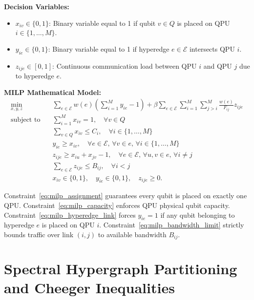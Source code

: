 \textbf{Decision Variables:}
\begin{itemize}
    \item $x_{iv} \in \{0, 1\}$: Binary variable equal to 1 if qubit $v \in Q$ is placed on QPU $i \in \{1, \dots, M\}$.
    \item $y_{ie} \in \{0, 1\}$: Binary variable equal to 1 if hyperedge $e \in \mathcal{E}$ intersects QPU $i$.
    \item $z_{ije} \in [0, 1]$: Continuous communication load between QPU $i$ and QPU $j$ due to hyperedge $e$.
\end{itemize}

\textbf{MILP Mathematical Model:}
\begin{align}
    \min_{x, y, z} \quad & \sum_{e \in \mathcal{E}} w(e) \left( \sum_{i=1}^M y_{ie} - 1 \right) + \beta \sum_{e \in \mathcal{E}} \sum_{i=1}^M \sum_{j > i}^M \frac{w(e)}{F_{ij}} z_{ije} \label{eq:milp_objective} \\
    \text{subject to} \quad & \sum_{i=1}^M x_{iv} = 1, \quad \forall v \in Q \label{eq:milp_assignment} \\
    & \sum_{v \in Q} x_{iv} \le C_i, \quad \forall i \in \{1, \dots, M\} \label{eq:milp_capacity} \\
    & y_{ie} \ge x_{iv}, \quad \forall e \in \mathcal{E}, \, \forall v \in e, \, \forall i \in \{1, \dots, M\} \label{eq:milp_hyperedge_link} \\
    & z_{ije} \ge x_{iu} + x_{jv} - 1, \quad \forall e \in \mathcal{E}, \, \forall u, v \in e, \, \forall i \neq j \label{eq:milp_link_load} \\
    & \sum_{e \in \mathcal{E}} z_{ije} \le B_{ij}, \quad \forall i < j \label{eq:milp_bandwidth_limit} \\
    & x_{iv} \in \{0, 1\}, \quad y_{ie} \in \{0, 1\}, \quad z_{ije} \ge 0. \label{eq:milp_integrality}
\end{align}

Constraint~\eqref{eq:milp_assignment} guarantees every qubit is placed on exactly one QPU. Constraint~\eqref{eq:milp_capacity} enforces QPU physical qubit capacity. Constraint~\eqref{eq:milp_hyperedge_link} forces $y_{ie} = 1$ if any qubit belonging to hyperedge $e$ is placed on QPU $i$. Constraint~\eqref{eq:milp_bandwidth_limit} strictly bounds traffic over link $(i, j)$ to available bandwidth $B_{ij}$.

\section{Spectral Hypergraph Partitioning and Cheeger Inequalities}
\label{sec:spectral_hypergraph}

